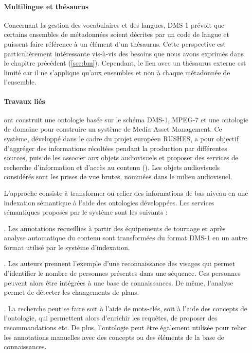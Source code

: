 \paragraph{Multilingue et thésaurus}
Concernant la gestion des vocabulaires et des langues, DMS-1 prévoit que certains ensembles de métadonnées soient décrites par un code de langue et puissent faire référence à un élément d'un thésaurus.
Cette perspective est particulièrement intéressante vis-à-vis des besoins que nous avons exprimés dans le chapitre précédent (\ref{sec:bm}).
Cependant, le lien avec un thésaurus externe est limité car il ne s'applique qu'aux ensembles et non à chaque métadonnée de l'ensemble.

\paragraph{Travaux liés}
\cite{Marcos2009} ont construit une ontologie basée sur le schéma DMS-1, MPEG-7 et une ontologie de domaine pour construire un système de Media Asset Management. 
Ce système, développé dans le cadre du projet européen RUSHES, a pour objectif d'aggréger des informations récoltées pendant la production par différentes sources, puis de les associer aux objets audiovisuels et proposer des services de recherche d'information et d'accès au contenu (\cite{Gorka2008}). 
Les objets audiovisuels considérés sont les prises de vue brutes, nommées  dans le milieu audiovisuel.

L'approche consiste à transformer ou relier des informations de bas-niveau en une indexation sémantique à l'aide des ontologies développées.
Les services sémantiques proposés par le système sont les suivants : 
\begin{liste}
	\item {}. 
	Les annotations recueillies à partir des équipements de tournage et après analyse automatique du contenu sont transformées du format DMS-1 en un autre format utilisé par le système d'indexation.
	\item {}. 
	Les auteurs prennent l'exemple d'une reconnaissance des visages qui permet d'identifier le nombre de personnes présentes dans une séquence.
	Ces personnes peuvent alors être intégrées à une base de connaissances.
	De même, l'analyse permet de détecter les changements de plans.
	\item {}. 
	La recherche peut se faire soit à l'aide de mots-clés, soit à l'aide des concepts de l'ontologie, qui permettent alors d'enrichir les requêtes, de proposer des recommandations etc. 
	De plus, l'ontologie peut être également utilisée pour relier les annotations manuelles avec des concepts ou des éléments de la base de connaissances.
\end{liste}

